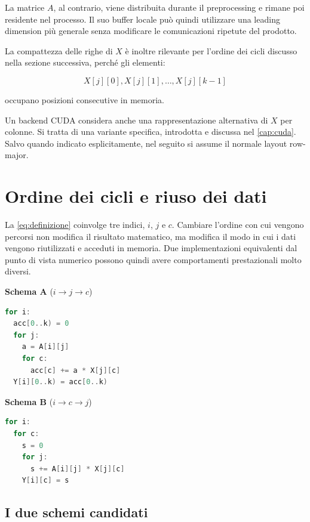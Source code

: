 La matrice $A$, al contrario, viene distribuita durante il preprocessing
e rimane poi residente nel processo. Il suo buffer locale può quindi
utilizzare una leading dimension più generale senza modificare le
comunicazioni ripetute del prodotto.

La compattezza delle righe di $X$ è inoltre rilevante per l'ordine dei
cicli discusso nella sezione successiva, perché gli elementi:

\[
X[j][0],X[j][1],\ldots,X[j][k-1]
\]

occupano posizioni consecutive in memoria.

Un backend CUDA considera anche una rappresentazione alternativa di $X$
per colonne. Si tratta di una variante specifica, introdotta e discussa
nel \cref{cap:cuda}. Salvo quando indicato esplicitamente, nel
seguito si assume il normale layout row-major.

\section{Ordine dei cicli e riuso dei dati}\label{sec:schemi}

La \cref{eq:definizione} coinvolge tre indici, $i$, $j$ e $c$.
Cambiare l'ordine con cui vengono percorsi non modifica il risultato
matematico, ma modifica il modo in cui i dati vengono riutilizzati e
acceduti in memoria. Due implementazioni equivalenti dal punto di vista
numerico possono quindi avere comportamenti prestazionali molto diversi.


\begin{center}
\begin{minipage}[t]{0.47\linewidth}
\textbf{Schema A} ($i \to j \to c$)
\begin{lstlisting}[language=C]
for i:
  acc[0..k) = 0
  for j:
    a = A[i][j]
    for c:
      acc[c] += a * X[j][c]
  Y[i][0..k) = acc[0..k)
\end{lstlisting}
\end{minipage}\hfill
\begin{minipage}[t]{0.47\linewidth}
\textbf{Schema B} ($i \to c \to j$)
\begin{lstlisting}[language=C]
for i:
  for c:
    s = 0
    for j:
      s += A[i][j] * X[j][c]
    Y[i][c] = s
\end{lstlisting}
\end{minipage}
\end{center}

\subsection{I due schemi candidati}

